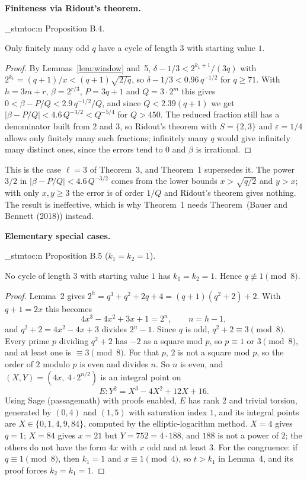 \documentclass[11pt]{article}
\newenvironment{named}[1]{%
  \par\addvspace{\medskipamount}%
  \pagebreak[3]%
  \noindent{\bfseries #1}\space\ignorespaces
  \stmtoc{#1}%
}{\par\addvspace{\medskipamount}}
\newcommand{\topic}[1]{\par\noindent\textbf{#1}}
\newcommand{\stmtoc}[1]{ \qn_stmtoc:n {#1} }
\begin{document}
\topic{Finiteness via Ridout's theorem.}
\begin{named}{Proposition B.4.}
Only finitely many odd $q$ have a cycle of length $3$ with starting value $1$.
\end{named}

\begin{proof}
By Lemmas~\ref{lem:window} and~5, $\delta - 1/3 < 2^{k_1+1}/(3q)$ with $2^{k_1} = (q+1)/x < (q+1)\sqrt{2/q}$, so $\delta - 1/3 < 0.96\, q^{-1/2}$ for $q \ge 71$.
With $h = 3m + r$, $\beta = 2^{r/3}$, $P = 3q + 1$ and $Q = 3 \cdot 2^m$ this gives $0 < \beta - P/Q < 2.9\, q^{-1/2}/Q$, and since $Q < 2.39(q+1)$ we get $|\beta - P/Q| < 4.6\, Q^{-3/2} < Q^{-5/4}$ for $Q > 450$.
The reduced fraction still has a denominator built from $2$ and $3$, so Ridout's theorem with $S = \{2, 3\}$ and $\varepsilon = 1/4$ allows only finitely many such fractions; infinitely many $q$ would give infinitely many distinct ones, since the errors tend to $0$ and $\beta$ is irrational.
\end{proof}

This is the case $\ell = 3$ of Theorem~3, and Theorem~1 supersedes it.
The power $3/2$ in $|\beta - P/Q| < 4.6\, Q^{-3/2}$ comes from the lower bounds $x > \sqrt{q/2}$ and $y > x$; with only $x, y \ge 3$ the error is of order $1/Q$ and Ridout's theorem gives nothing.
The result is ineffective, which is why Theorem~1 needs Theorem~(Bauer and Bennett (2018)) instead.

\topic{Elementary special cases.}
\begin{named}{Proposition B.5 ($k_1 = k_2 = 1$).}
No cycle of length $3$ with starting value $1$ has $k_1 = k_2 = 1$.
Hence $q \not\equiv 1 \pmod{8}$.
\end{named}

\begin{proof}
Lemma~2 gives $2^h = q^3 + q^2 + 2q + 4 = (q+1)(q^2 + 2) + 2$.
With $q + 1 = 2x$ this becomes
\[
4x^3 - 4x^2 + 3x + 1 = 2^n, \qquad n = h - 1,
\]
and $q^2 + 2 = 4x^2 - 4x + 3$ divides $2^n - 1$.
Since $q$ is odd, $q^2 + 2 \equiv 3 \pmod{8}$.
Every prime $p$ dividing $q^2 + 2$ has $-2$ as a square mod $p$, so $p \equiv 1$ or $3 \pmod{8}$, and at least one is $\equiv 3 \pmod{8}$.
For that $p$, $2$ is not a square mod $p$, so the order of $2$ modulo $p$ is even and divides $n$.
So $n$ is even, and $(X, Y) = (4x,\ 4 \cdot 2^{n/2})$ is an integral point on
\[
E \colon Y^2 = X^3 - 4X^2 + 12X + 16.
\]
Using Sage (passagemath) with proofs enabled, $E$ has rank $2$ and trivial torsion, generated by $(0, 4)$ and $(1, 5)$ with saturation index $1$, and its integral points are $X \in \{0, 1, 4, 9, 84\}$, computed by the elliptic-logarithm method. $X = 4$ gives $q = 1$; $X = 84$ gives $x = 21$ but $Y = 752 = 4 \cdot 188$, and $188$ is not a power of $2$; the others do not have the form $4x$ with $x$ odd and at least $3$.
For the congruence: if $q \equiv 1 \pmod{8}$, then $k_1 = 1$ and $x \equiv 1 \pmod{4}$, so $t > k_1$ in Lemma~4, and its proof forces $k_2 = k_1 = 1$.
\end{proof}
\end{document}
